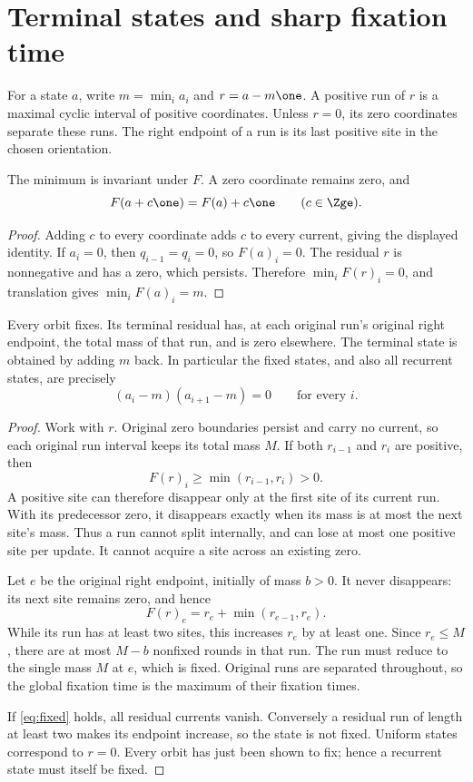 \section{Terminal states and sharp fixation time}\label{sec:temporal}
For a state $a$, write $m=\min_i a_i$ and $r=a-m\one$.
A positive run of $r$ is a maximal cyclic interval of positive coordinates.
Unless $r=0$, its zero coordinates separate these runs. The right endpoint
of a run is its last positive site in the chosen orientation.

\begin{lemma}\label{lem:minimum}
The minimum is invariant under $F$. A zero coordinate remains zero, and
\[
 F(a+c\one)=F(a)+c\one\qquad(c\in\Zge).
\]
\end{lemma}
\begin{proof}
Adding $c$ to every coordinate adds $c$ to every current, giving the
displayed identity. If $a_i=0$, then $q_{i-1}=q_i=0$, so $F(a)_i=0$.
The residual $r$ is nonnegative and has a zero, which persists. Therefore
$\min_i F(r)_i=0$, and translation gives $\min_i F(a)_i=m$.
\end{proof}

\begin{proposition}\label{prop:terminal}
Every orbit fixes. Its terminal residual has, at each original run's
original right endpoint, the total mass of that run, and is zero elsewhere.
The terminal state is obtained by adding $m$ back. In particular the
fixed states, and also all recurrent states, are precisely
\begin{equation}\label{eq:fixed}
 (a_i-m)(a_{i+1}-m)=0\qquad\text{for every }i.
\end{equation}
\end{proposition}
\begin{proof}
Work with $r$. Original zero boundaries persist and carry no current, so
each original run interval keeps its total mass $M$. If both $r_{i-1}$
and $r_i$ are positive, then
\[
 F(r)_i\ge\min(r_{i-1},r_i)>0.
\]
A positive site can therefore disappear only at the first site of its
current run. With its predecessor zero, it disappears exactly when its
mass is at most the next site's mass. Thus a run cannot split internally,
and can lose at most one positive site per update. It cannot acquire a
site across an existing zero.

Let $e$ be the original right endpoint, initially of mass $b>0$.
It never disappears: its next site remains zero, and hence
\[
 F(r)_e=r_e+\min(r_{e-1},r_e).
\]
While its run has at least two sites, this increases $r_e$ by at least
one. Since $r_e\le M$, there are at most $M-b$ nonfixed rounds in that
run. The run must reduce to the single mass $M$ at $e$, which is fixed.
Original runs are separated throughout, so the global fixation time is
the maximum of their fixation times.

If \eqref{eq:fixed} holds, all residual currents vanish. Conversely a
residual run of length at least two makes its endpoint increase, so the
state is not fixed. Uniform states correspond to $r=0$. Every orbit has
just been shown to fix; hence a recurrent state must itself be fixed.
\end{proof}


